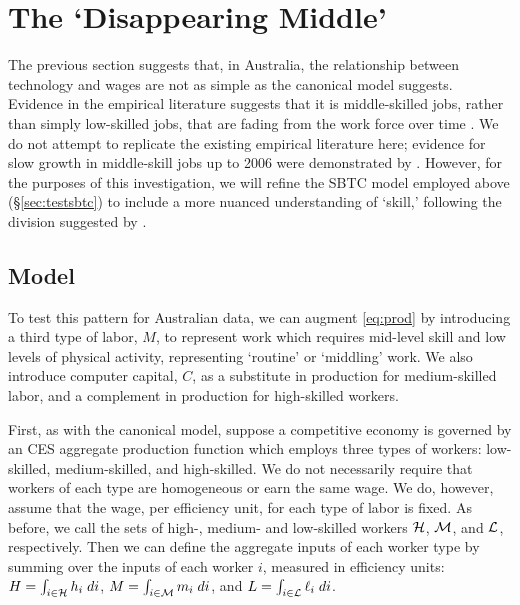 \section{The `Disappearing Middle'}\label{sec:disappearing}

The previous section suggests that, in Australia, the relationship between technology and wages are not as simple as the canonical model suggests. Evidence in the empirical literature suggests that it is middle-skilled jobs, rather than simply low-skilled jobs, that are fading from the work force over time \citep[e.g.][]{Harding1997,Cully1999,Esposto2012}. We do not attempt to replicate the existing empirical literature here; evidence for slow growth in middle-skill jobs up to 2006 were demonstrated by \citet{Esposto2012}. However, for the purposes of this investigation, we will refine the SBTC model employed above (\S\ref{sec:testsbtc}) to include a more nuanced understanding of `skill,' following the division suggested by \citet{Levy2003}.

\subsection{Model}

To test this pattern for Australian data, we can augment \eqref{eq:prod} by introducing a third type of labor, $M$, to represent work which requires mid-level skill and low levels of physical activity, representing `routine' or `middling' work. We also introduce computer capital, $C$, as a substitute in production for medium-skilled labor, and a complement in production for high-skilled workers.

First, as with the canonical model, suppose a competitive economy is governed by an CES aggregate production function which employs three types of workers: low-skilled, medium-skilled, and high-skilled. We do not necessarily require that workers of each type are homogeneous or earn the same wage. We do, however, assume that the wage, per efficiency unit, for each type of labor is fixed. As before, we call the sets of high-, medium- and low-skilled workers $\mathcal{H}$, $\mathcal{M}$, and $\mathcal{L}$, respectively. Then we can define the aggregate inputs of each worker type by summing over the inputs of each worker $i$, measured in efficiency units: ${H = \int_{i\in\mathcal{H}}h_i\;di}$, ${M = \int_{i\in\mathcal{M}}m_i\;di}$, and ${L = \int_{i\in\mathcal{L}}\ell_i\;di}$.

